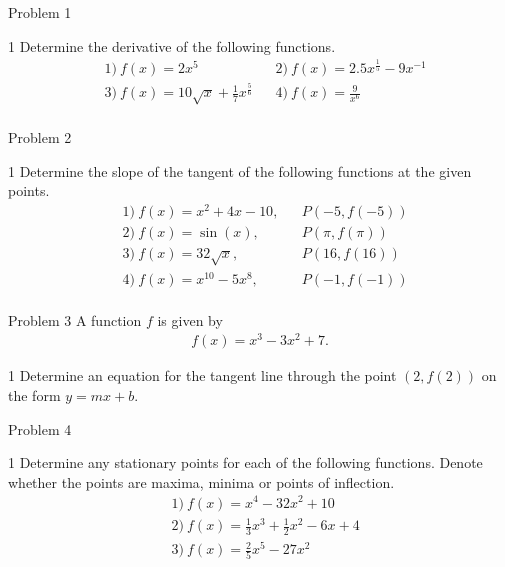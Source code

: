 \begin{opgavetekst}{Problem 1}
\end{opgavetekst}
\begin{delopgave}{1}
	Determine the derivative of the following functions.
	\begin{align*}
		&1) \ f(x) = 2x^5    &  &2) \ f(x) = 2.5x^{\frac{1}{5}}-9x^{-1}   \\
		&3) \ f(x) = 10\sqrt{x} + \frac{1}{7}x^{\frac{5}{6}}    &  &4) \  f(x) = \frac{9}{x^6}  \\
	\end{align*}
\end{delopgave}


\begin{opgavetekst}{Problem 2}
\end{opgavetekst}
\begin{delopgave}{1}
	Determine the slope of the tangent of the following functions at the given points.
	\begin{align*}
		&1) \ f(x) = x^2 + 4x -10, & &P(-5,f(-5)) \\
		&2) \ f(x) = \sin(x), & &P(\pi,f(\pi)) \\
		&3) \ f(x) = 32\sqrt{x}, & &P(16,f(16)) \\
		&4) \ f(x) = x^{10}-5x^8, & &P(-1,f(-1)) \\
	\end{align*}
\end{delopgave}

\begin{opgavetekst}{Problem 3}
	A function $f$ is given by
	\begin{align*}
		f(x) = x^3 - 3x^2 + 7.
	\end{align*}
\end{opgavetekst}
\begin{delopgave}{1}
	Determine an equation for the tangent line through the point $(2,f(2))$ on the form $y = mx + b$. 
\end{delopgave}


\begin{opgavetekst}{Problem 4}
\end{opgavetekst}
\begin{delopgave}{1}
	Determine any stationary points for each of the following functions. Denote whether the points are maxima, minima or
	points of inflection.
	\begin{align*}
		&1) \ f(x) = x^4 - 32x^2 + 10 \\
		&2) \ f(x) = \frac{1}{3}x^3 + \frac{1}{2}x^2 - 6x + 4\\
		&3) \ f(x) = \frac{2}{5}x^5 - 27x^2 \\
	\end{align*}
\end{delopgave}

